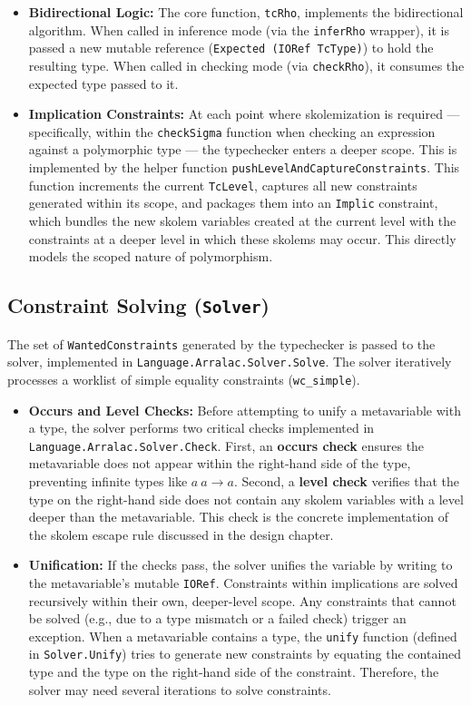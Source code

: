 \begin{itemize}
    \item \textbf{Bidirectional Logic:} The core function, \texttt{tcRho}, implements the bidirectional algorithm. When called in inference mode (via the \texttt{inferRho} wrapper), it is passed a new mutable reference (\texttt{Expected (IORef TcType)}) to hold the resulting type. When called in checking mode (via \texttt{checkRho}), it consumes the expected type passed to it.

    \item \textbf{Implication Constraints:} At each point where skolemization is required --- specifically, within the \texttt{checkSigma} function when checking an expression against a polymorphic type --- the typechecker enters a deeper scope. This is implemented by the helper function \texttt{pushLevelAndCaptureConstraints}. This function increments the current \texttt{TcLevel}, captures all new constraints generated within its scope, and packages them into an \texttt{Implic} constraint, which bundles the new skolem variables created at the current level with the constraints at a deeper level in which these skolems may occur. This directly models the scoped nature of polymorphism.
\end{itemize}

\subsection{Constraint Solving (\texttt{Solver})}
The set of \texttt{WantedConstraints} generated by the typechecker is passed to the solver, implemented in \texttt{Language.Arralac.Solver.Solve}. The solver iteratively processes a worklist of simple equality constraints (\texttt{wc\_simple}).

\begin{itemize}
    \item \textbf{Occurs and Level Checks:} Before attempting to unify a metavariable with a type, the solver performs two critical checks implemented in \texttt{Language.Arralac.Solver.Check}. First, an \textbf{occurs check} ensures the metavariable does not appear within the right-hand side of the type, preventing infinite types like $a ~ a \rightarrow a$. Second, a \textbf{level check} verifies that the type on the right-hand side does not contain any skolem variables with a level deeper than the metavariable. This check is the concrete implementation of the skolem escape rule discussed in the design chapter.

    \item \textbf{Unification:} If the checks pass, the solver unifies the variable by writing to the metavariable's mutable \texttt{IORef}. Constraints within implications are solved recursively within their own, deeper-level scope. Any constraints that cannot be solved (e.g., due to a type mismatch or a failed check) trigger an exception. When a metavariable contains a type, the \texttt{unify} function (defined in \texttt{Solver.Unify}) tries to generate new constraints by equating the contained type and the type on the right-hand side of the constraint. Therefore, the solver may need several iterations to solve constraints.
\end{itemize}

